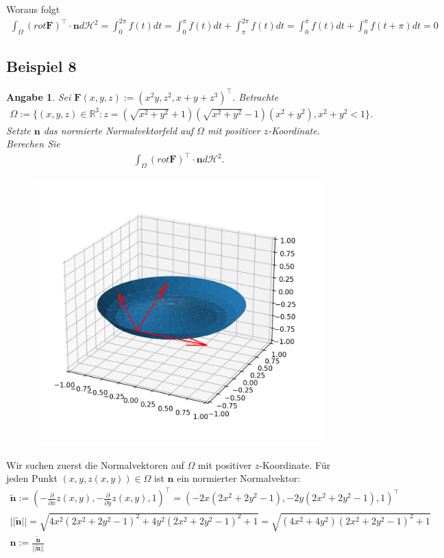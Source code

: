 \documentclass[]{article}
\newtheorem*{angabe*}{Angabe}
\begin{document}
Woraus folgt
\begin{align*}
	\int_\Omega (rot \bm{F})^\top \cdot \bm{n} d\mathcal{H}^2 = \int_0^{2\pi} f(t) dt = \int_0^{\pi} f(t) dt + \int_\pi^{2\pi} f(t) dt = \int_0^{\pi} f(t) dt + \int_0^{\pi} f(t+\pi) dt = 0
\end{align*}

\newpage

\subsection*{Beispiel 8}
\begin{angabe*}
	Sei $\bm{F}(x,y,z):=(x^2y, z^2, x+y+z^3)^\top$. Betrachte
	\begin{align*}
		\Omega := \{(x,y,z) \in \mathbb{R}^3: z=(\sqrt{x^2+y^2}+1)(\sqrt{x^2+y^2}-1)(x^2+y^2), x^2+y^2 < 1\}.
	\end{align*}
	Setzte $\bm{n}$ das normierte Normalvektorfeld auf $\Omega$ mit positiver $z$-Koordinate. Berechen Sie
	\begin{align*}
		\int_\Omega (rot \bm{F})^\top \cdot \bm{n} d\mathcal{H}^2.
	\end{align*}
\end{angabe*}

\begin{figure}[h!]
	\includegraphics[width=0.5\columnwidth]{bsp_8.png}
\end{figure}

Wir suchen zuerst die Normalvektoren auf $\Omega$ mit positiver $z$-Koordinate. Für jeden Punkt $(x,y,z(x,y)) \in \Omega$ ist $\bm{n}$ ein normierter Normalvektor:
\begin{align*}
	\tilde{\bm{n}} := \left(-\frac{\partial}{\partial x} z(x,y), -\frac{\partial}{\partial y} z(x,y), 1\right)^\top = (-2x(2x^2+2y^2-1), -2y(2x^2+2y^2-1), 1)^\top\\
	||\tilde{\bm{n}}|| = \sqrt{4x^2(2x^2+2y^2-1)^2 + 4y^2(2x^2+2y^2-1)^2 + 1} = \sqrt{(4x^2+4y^2)(2x^2+2y^2-1)^2+1}\\
	\bm{n}:= \frac{\tilde{\bm{n}}}{||\tilde{\bm{n}}||}
\end{align*}
\end{document}

